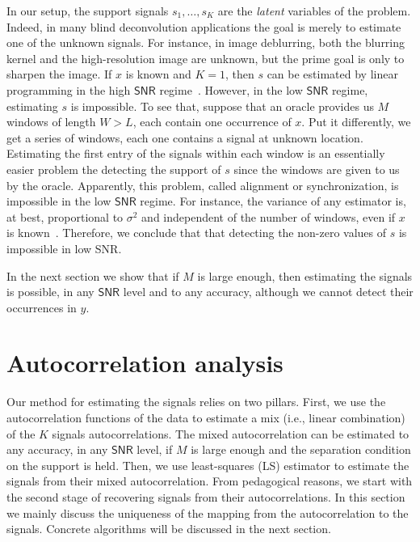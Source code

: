 \documentclass[english,11pt]{article}
\numberwithin{equation}{section}
\theoremstyle{plain}
\theoremstyle{definition}
\theoremstyle{remark}
\theoremstyle{plain}
\theoremstyle{remark}
\theoremstyle{plain}
\theoremstyle{plain}
\newcommand{\SNR}{{\textsf{SNR}}}
\begin{document}
In our setup, the support signals $s_1,\ldots,s_K$ are the \emph{latent} variables of the problem. Indeed, in many blind deconvolution applications the goal is merely to estimate one of the unknown signals. For instance, in image deblurring, both the blurring
kernel and the high-resolution image are unknown, but the prime goal is only
to sharpen the image.
If $x$ is known and $K=1$, then  $s$ can be estimated by linear programming  in the high $\SNR$ regime~\cite{de2012exact,duval2015exact,bendory2016robust,bendory2017robust,bernstein2017deconvolution}. However, in the low $\SNR$ regime, estimating $s$ is impossible. To see that, suppose that an oracle provides us $M$ windows of length $W>L$, each contain one occurrence of $x$. Put it differently, we get a series of windows, each one contains a signal at unknown location.
Estimating the first entry of the signals within each  window is an essentially easier problem the detecting the support of $s$ since the windows are given to us by the oracle. Apparently, this problem, called alignment or synchronization, is impossible in the low $\SNR$ regime.
For instance, the variance of any estimator is, at best, proportional to $\sigma^2$ and independent of the number of windows, even if $x$ is known~\cite{aguerrebere2016fundamental}. Therefore, we conclude that that detecting the non-zero values of $s$ is impossible in low \SNR. 

In the next section we show that if $M$ is large enough, then estimating the signals is possible, in any $\SNR$ level and to any accuracy, although we cannot detect their occurrences in $y$. 



\section{Autocorrelation analysis}   \label{sec:autocorrelation}

Our method for estimating the signals relies on two pillars. 
First, we use the autocorrelation functions of the data to estimate a mix (i.e., linear combination) of the $K$ signals autocorrelations. The mixed autocorrelation can be estimated to any accuracy, in any $\SNR$ level, if $M$ is large enough and the separation condition on the support is held. Then, we use least-squares (LS) estimator to estimate the signals from their mixed autocorrelation. From pedagogical reasons, we start with the second stage of recovering signals from their autocorrelations. In this section we mainly discuss the uniqueness of the mapping from the autocorrelation to the signals. Concrete algorithms will be discussed in the next section.
\end{document}
